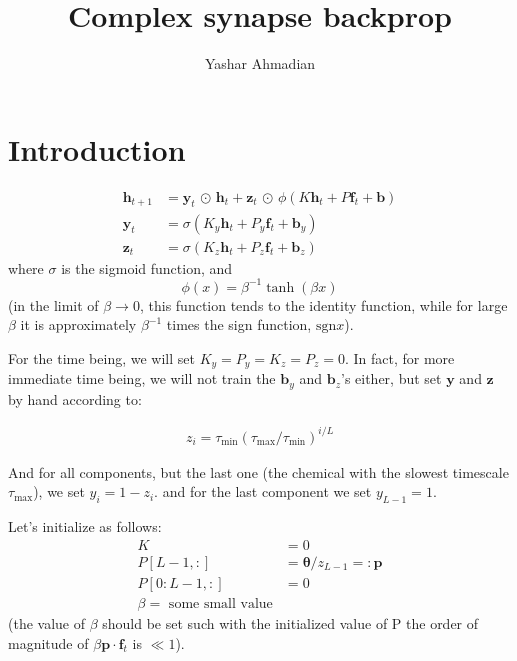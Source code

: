 \documentclass[11pt]{article}
\title{Complex synapse backprop}
\author[1]{Yashar Ahmadian}%
\renewcommand\b\mathbf
\theoremstyle{remark}%
\theoremstyle{definition}
\newcommand{\h}{\b{h}}
\newcommand{\y}{\b{y}}
\newcommand{\z}{\b{z}}
\newcommand{\f}{\b{f}}
\newcommand{\sdot}{\, {\scriptscriptstyle \odot}\, }
\begin{document}
\maketitle


\section{Introduction}





\begin{align}
    \h_{t+1} &= \y_t\sdot \h_t + \z_t\sdot \phi(K\h_t + P\f_{t} + \b{b})
    \\
    \y_t &= \sigma(K_y \h_t + P_y \f_t + \b{b}_y)
    \\
    \z_t &= \sigma(K_z \h_t + P_z \f_t + \b{b}_z)
\end{align}
where $\sigma$ is the sigmoid function, and 
\begin{equation}
\phi(x) = \beta^{-1}\tanh(\beta x)
\end{equation}
(in the limit of $\beta\to 0$, this function tends to the identity function, while for large $\beta$ it is approximately  $\beta^{-1}$ times the sign function, $\text{sgn} x$).

For the time being, we will set $K_y=P_y = K_z=P_z = 0$.
In fact, for more immediate time being, we will not train the $\b{b}_y$  and $\b{b}_z$'s either, but set $\y$ and $\z$ by hand according to:

\begin{align}
    z_i = \tau_{\min} (\tau_{\max}/\tau_{\min})^{i/L}
\end{align}

And for all components, but the last one (the chemical with the slowest timescale $\tau_{\max}$), we set $y_i  = 1 - z_i$. and for the last component we set $y_{L-1} = 1$.



Let's initialize as follows: 
\begin{align}
K &= 0
\\
P[L-1, :] &= \bm{\theta} / z_{L-1} =: \b{p}
\\
P[0:L-1, :] &= 0
\\
\beta = \text{ some small value}
\end{align}
(the value of $\beta$ should be set such with the initialized value of P the order of magnitude of $\beta \b{p}\cdot \f_t$ is $\ll 1$).
\end{document}

